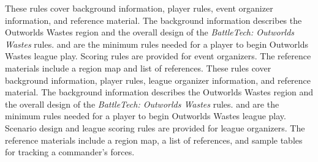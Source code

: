  {
These rules cover background information, player rules, event organizer information, and reference material.
The background information describes the Outworlds Wastes region and the overall design of the \emph{BattleTech: Outworlds Wastes} rules.
 and  are the minimum rules needed for a player to begin Outworlds Wastes league play.
Scoring rules are provided for event organizers.
The reference materials include a region map and list of references.
} {
These rules cover background information, player rules, league organizer information, and reference material.
The background information describes the Outworlds Wastes region and the overall design of the \emph{BattleTech: Outworlds Wastes} rules.
 and  are the minimum rules needed for a player to begin Outworlds Wastes league play.
Scenario design and league scoring rules are provided for league organizers.
The reference materials include a region map, a list of references, and sample tables for tracking a commander's forces.
}

